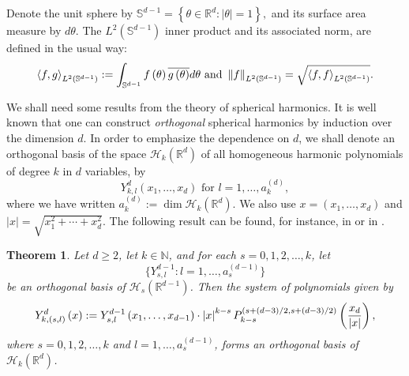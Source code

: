 \documentclass[12pt]{amsart}
\newtheorem{theorem}{Theorem}
\newcommand{\N}{\mathbb{N}}
\begin{document}
Denote the unit sphere by 
$
\mathbb{S}^{d-1}=\left\{ \theta \in \mathbb{R}^{d}:\left\vert \theta
\right\vert =1\right\},
$
and its surface area measure by $d\theta $. The  $L^{2}(\mathbb{S}^{d-1})$  inner product and its associated norm, are defined in the usual way:
\begin{equation}
\left\langle f,g\right\rangle _{L^{2}(\mathbb{S}^{d-1})}:=\int_{\mathbb{S}%
^{d-1}}f\left( \theta \right) \overline{g\left( \theta \right) }d\theta 
\text{ and }\left\Vert f\right\Vert _{L^{2}(\mathbb{S}^{d-1})}=\sqrt{%
\left\langle f,f\right\rangle _{L^{2}(\mathbb{S}^{d-1})}}.
\label{eqprodspher}
\end{equation}

We shall need some results from the theory of spherical harmonics. It is well known that one can
construct \emph{orthogonal} spherical harmonics by induction over the
dimension $d$. In order to emphasize the dependence on $d$, we shall denote an orthogonal basis of the space $\mathcal{H}%
_{k}\left( \mathbb{R}^{d}\right)$ of all homogeneous harmonic polynomials of degree $k$ in $d$
variables, by 
\begin{equation*}
Y_{k,l}^{d}\left( x_{1},\dots,x_{d}\right) \text{ for }l=1,\dots,a_{k}^{\left(
d\right) },
\end{equation*}%
where we have written $a_{k}^{\left( d\right) }:=\dim \mathcal{H}_{k}\left( 
\mathbb{R}^{d}\right) .$ We also use  $x =\left(
x_{1},\dots ,x_{d}\right) $ and $\left\vert x\right\vert =\sqrt{
x_{1}^{2}+ \cdots +x_{d}^{2}}.$
The following result can be found, for instance, in \cite[p.
461]{AAR99} or in \cite{Frya91}.

\begin{theorem}
\label{ThmSphRec} Let $d\geq 2$, let $k \in \N$, and  for each $s=0,1,2,\dots,k$, let 
$$\{
Y_{s,l}^{d-1}: l=1,\dots, a_{s}^{\left( d-1\right) }\}
$$ be an orthogonal basis of $
\mathcal{H}_{s}\left( \mathbb{R}^{d-1}\right)$.
Then the system of polynomials given by
\begin{equation}
Y_{k,\left( s,l\right) }^{d}\left( x\right) 
:=
Y_{s,l}^{d-1}\left(
x_{1},\dots,x_{d-1}\right) \cdot \left\vert x\right\vert ^{k-s}P_{k-s}^{\left(
s+\left( d-3\right) /2, s+\left( d-3\right) /2\right) }\left( \frac{x_{d}}{%
\left\vert x\right\vert }\right)   \label{eqintFF},
\end{equation}
where $s=0,1,2,\dots ,k$ and $l=1,\dots,a_{s}^{(d-1)}$, forms an orthogonal basis
of $\mathcal{H}_{k}\left( \mathbb{R}^{d}\right) $.
\end{theorem}
\end{document}
